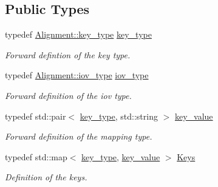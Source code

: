 \subsection*{Public Types}
\begin{DoxyCompactItemize}
\item 
typedef \hyperlink{class_d_d4hep_1_1_alignments_1_1_alignment_ab824a65f935a0c79b9ea1a7a85014b88}{Alignment::key\_\-type} \hyperlink{class_d_d4hep_1_1_alignments_1_1_interna_1_1_alignment_container_a7395f0e25d9e524d2a2bd7df0f4364e6}{key\_\-type}
\begin{DoxyCompactList}\small\item\em Forward defintion of the key type. \item\end{DoxyCompactList}\item 
typedef \hyperlink{class_d_d4hep_1_1_i_o_v}{Alignment::iov\_\-type} \hyperlink{class_d_d4hep_1_1_alignments_1_1_interna_1_1_alignment_container_a99b2a8d269ecefcf1b59269ad94e75e3}{iov\_\-type}
\begin{DoxyCompactList}\small\item\em Forward definition of the iov type. \item\end{DoxyCompactList}\item 
typedef std::pair$<$ \hyperlink{class_d_d4hep_1_1_alignments_1_1_interna_1_1_alignment_container_a7395f0e25d9e524d2a2bd7df0f4364e6}{key\_\-type}, std::string $>$ \hyperlink{class_d_d4hep_1_1_alignments_1_1_interna_1_1_alignment_container_a64a96ad5b67f6e67b12fd3aaaa8bbcb8}{key\_\-value}
\begin{DoxyCompactList}\small\item\em Forward definition of the mapping type. \item\end{DoxyCompactList}\item 
typedef std::map$<$ \hyperlink{class_d_d4hep_1_1_alignments_1_1_interna_1_1_alignment_container_a7395f0e25d9e524d2a2bd7df0f4364e6}{key\_\-type}, \hyperlink{class_d_d4hep_1_1_alignments_1_1_interna_1_1_alignment_container_a64a96ad5b67f6e67b12fd3aaaa8bbcb8}{key\_\-value} $>$ \hyperlink{class_d_d4hep_1_1_alignments_1_1_interna_1_1_alignment_container_a3fc62784c22ba44d9ac63c424ec55799}{Keys}
\begin{DoxyCompactList}\small\item\em Definition of the keys. \item\end{DoxyCompactList}\end{DoxyCompactItemize}
